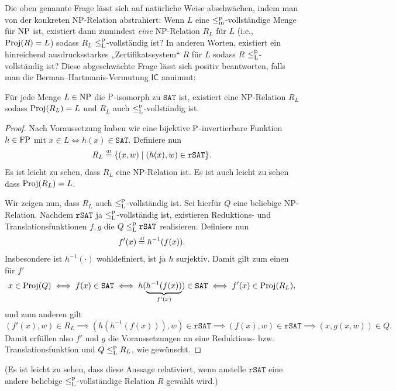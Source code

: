 Die oben genannte Frage lässt sich auf natürliche Weise abschwächen, indem man von der konkreten NP-Relation abstrahiert: Wenn $L$ eine $\leqmp$-vollständige Menge für $\NP$ ist, existiert dann zumindest \emph{eine} NP-Relation $R_L$ für $L$ (i.e., $\Proj(R)=L$) sodass $R_L$ $\leqlp$-vollständig ist? In anderen Worten, existiert ein hinreichend ausdrucksstarkes „Zertifikatssystem“ $R$ für $L$ sodass $R$ $\leqlp$-vollständig ist?
Diese abgeschwächte Frage lässt sich positiv beantworten, falls man die Berman--Hartmanis-Vermutung $\mathsf{IC}$ annimmt:
\begin{observation}\label{obs:isomorphs-sind-leqlp-vollst}
    Für jede Menge $L\in \NP$ die $\P$-isomorph zu $\mathtt{SAT}$ ist, existiert eine NP-Relation $R_L$ sodass $\Proj(R_L)=L$ und $R_L$ auch $\leqlp$-vollständig ist.
\end{observation}
\begin{proof}
    Nach Voraussetzung haben wir eine bijektive $\P$-invertierbare Funktion $h\in\FP$ mit $x\in L \iff h(x) \in \mathtt{SAT}$.
    Definiere nun
    \[ R_L \defeq \{ (x,w) \mid (h(x), w)\in \mathtt{rSAT}\}. \]
    Es ist leicht zu sehen, dass $R_L$ eine NP-Relation ist. Es ist auch leicht zu sehen dass $\Proj(R_L)=L$.

    Wir zeigen nun, dass $R_L$ auch $\leqlp$-vollständig ist. Sei hierfür $Q$ eine beliebige NP-Relation. Nachdem $\mathtt{rSAT}$ ja $\leqlp$-vollständig ist, existieren Reduktions- und Translationsfunktionen $f,g$ die $Q\leqlp \mathtt{rSAT}$ realisieren.
    Definiere nun
    \[ f'(x) \defeq h^{-1}(f(x)). \]
    Insbesondere ist $h^{-1}(\cdot)$ wohldefiniert, ist ja $h$ surjektiv.
    Damit gilt zum einen für $f'$
    \[ x\in \Proj(Q) \iff f(x) \in \mathtt{SAT} \iff h(\underbrace{h^{-1}(f(x))}_{f'(x)}) \in \mathtt{SAT} \iff f'(x) \in \Proj(R_L), \]
    und zum anderen gilt
    \[ (f'(x), w) \in R_L \implies (h(h^{-1}(f(x))), w)\in \mathtt{rSAT} \implies (f(x), w)\in \mathtt{rSAT} \implies (x, g(x, w))\in Q.  \]
    Damit erfüllen also $f'$ und $g$ die Voraussetzungen an eine Reduktions- bzw. Translationsfunktion und $Q\leqlp R_L$, wie gewünscht.
\end{proof}
(Es ist leicht zu sehen, dass diese Aussage relativiert, wenn anstelle $\mathtt{rSAT}$ eine andere beliebige $\leqlp$-vollständige Relation $R$ gewählt wird.)

